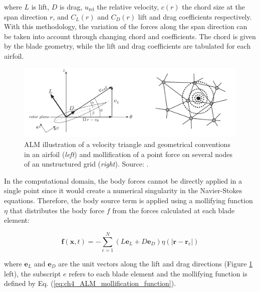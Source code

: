 where $L$ is lift, $D$ is drag, $u_\mathrm{rel}$ the relative velocity, $c \left( r \right)$ the chord size at the span direction $r$, and $C_L \left( r \right)$ and $C_D \left( r \right)$ lift and drag coefficients respectively. With this methodology, the variation of the forces along the span direction can be taken into account through changing chord and coefficients. The chord is given by the blade geometry, while the lift and drag coefficients are tabulated for each airfoil.


\begin{figure}[h!]
	\centering
	\includegraphics[scale=0.4]{./part2_developments/figures_ch4_SLI/ALM_airfoil_and_mollification_benard}
	\caption[ALM illustration of a velocity triangle and geometrical conventions in an airfoil and mollification of a point force on several nodes of an unstructured grid]{ALM illustration of a velocity triangle and geometrical conventions in an airfoil (\textsl{left}) and mollification of a point force on several nodes of an unstructured grid (\textsl{right}). Source: .}
	\label{fig:ALM_airfoil_and_mollification_benard}
\end{figure} 
 

In the computational domain, the body forces cannot be directly applied in a single point since it would create a numerical singularity in the Navier-Stokes equations. Therefore, the body source term is applied using a mollifying function $\eta$ that distributes the body force $f$ from the forces calculated at each blade element:

\begin{equation}
\textbf{f} \left( \textbf{x}, t \right) = - \sum_{e=1}^{N} \left( L \textbf{e}_L + D \textbf{e}_D \right) \eta \left( |\textbf{r} - \textbf{r}_e| \right)
\end{equation}

where $\textbf{e}_L$ and $\textbf{e}_D$ are the unit vectors along the lift and drag directions (Figure \ref{fig:ALM_airfoil_and_mollification_benard} left), the subscript $e$ refers to each blade element and the mollifying function is defined by Eq. (\ref{eq:ch4_ALM_mollification_function}).

